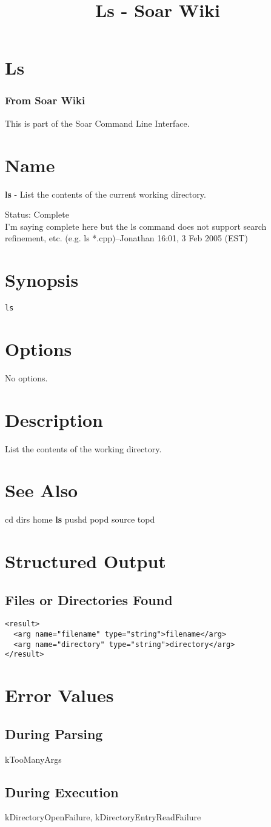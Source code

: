 \documentclass[10pt]{article}
\title{Ls - Soar Wiki}
\begin{document}
\section*{Ls}
\subsubsection*{From Soar Wiki}


 This is part of the Soar Command Line Interface. 
\section*{ Name }


 \textbf{ls}
 - List the contents of the current working directory. 


 Status: Complete\\ 
I'm saying complete here but the ls command does not support search refinement, etc. (e.g. ls *.cpp)--Jonathan 16:01, 3 Feb 2005 (EST) 
\section*{ Synopsis }
\begin{verbatim}
ls

\end{verbatim}
\section*{ Options }


 No options. 
\section*{ Description }


 List the contents of the working directory. 
\section*{ See Also }
\begin{description}
cd dirs home \textbf{ls}
 pushd popd source topd

\end{description}
\section*{ Structured Output }
\subsection*{ Files or Directories Found }
\begin{verbatim}
<result>
  <arg name="filename" type="string">filename</arg>
  <arg name="directory" type="string">directory</arg>
</result>

\end{verbatim}
\section*{ Error Values }
\subsection*{ During Parsing }


 kTooManyArgs
\subsection*{ During Execution }


 kDirectoryOpenFailure, kDirectoryEntryReadFailure
\end{document}
